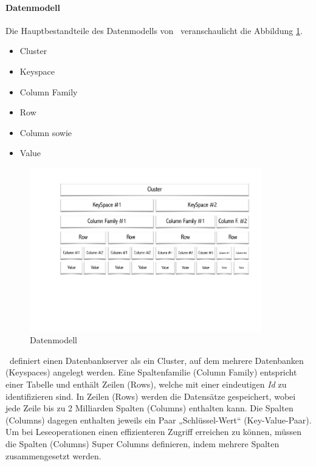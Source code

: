 \paragraph{Datenmodell}
Die Hauptbestandteile des Datenmodells von \cass\ veranschaulicht die Abbildung \ref{img:cassandraDataModel}.
\begin{itemize}
\item Cluster
\item Keyspace
\item Column Family
\item Row
\item Column sowie
\item Value
\end{itemize}
\begin{figure}[H]
\centering
 \includegraphics[trim = 25mm 70mm 15mm 15mm, clip, width=0.9\textwidth]{resources/cassandra/cassandraDataModel}
\caption[Datenmodell]{Datenmodell}
\label{img:cassandraDataModel}
\end{figure}
\cass\ definiert einen Datenbankserver als ein Cluster, auf dem mehrere Datenbanken (Keyspaces) angelegt werden. Eine Spaltenfamilie (Column Family) entspricht einer Tabelle und enthält Zeilen (Rows), welche mit einer eindeutigen \textit{Id} zu identifizieren sind. In Zeilen (Rows) werden die Datensätze gespeichert, wobei jede Zeile bis zu 2 Milliarden Spalten (Columns) enthalten kann. Die Spalten (Columns) dagegen enthalten jeweils ein Paar „Schlüssel-Wert“ (Key-Value-Paar). 
Um bei Leseoperationen einen effizienteren Zugriff erreichen zu können, müssen die Spalten (Columns) Super Columns definieren, indem mehrere Spalten zusammengesetzt werden.

